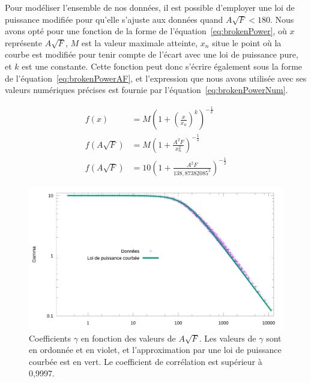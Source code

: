 	
	Pour modéliser l'ensemble de nos données, il est possible d'employer une loi de puissance modifiée pour qu'elle s'ajuste aux données quand $A\sqrt{F}<180$. Nous avons opté pour une fonction de la forme de l'équation~\ref{eq:brokenPower}, où $x$ représente $A\sqrt{F}$, $M$ est la valeur maximale atteinte, $x_{n}$ situe le point où la courbe est modifiée pour tenir compte de l'écart avec une loi de puissance pure, et $k$ est une constante. Cette fonction peut donc s'écrire également sous la forme de l'équation~\ref{eq:brokenPowerAF}, et l'expression que nous avons utilisée avec ses valeurs numériques précises est fournie par l'équation~\ref{eq:brokenPowerNum}.
	
	\begin{align}
		\label{eq:brokenPower}
		f(x) &= M \left( 1 + \left( \frac{x}{x_{n}} \right)^{k} \right)^{-\frac{1}{k}} \\
		\label{eq:brokenPowerAF}
		f(A\sqrt{F}) &= M \left( 1 + \frac{A^{2}F}{x_{n}^{2}}\right)^{-\frac{1}{2}} \\
		\label{eq:brokenPowerNum}
		f(A\sqrt{F}) &= 10 \left( 1 + \frac{A^{2}F}{138,87382085^{2}} \right)^{-\frac{1}{2}}
	\end{align}
	
	\begin{figure}[!htb]
		\centering
		\includegraphics[width=\textwidth]{figures/ch4/asqrtFVgammaLogLogPowerFit}
		\caption[Coefficients $\gamma$ vs. F et A, quinquies (log-log et loi de puissance)]{Coefficients $\gamma$ en fonction des valeurs de $A\sqrt{F}$. Les valeurs de $\gamma$ sont en ordonnée et en violet, et l'approximation par une loi de puissance courbée est en vert. Le coefficient de corrélation est supérieur à 0,9997.}
		\label{fig:asqrtFVgammaLogLogPowerFit}
	\end{figure}
	
